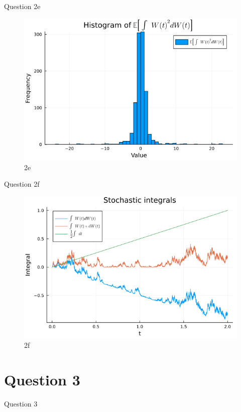 \documentclass[compress,12pt]{beamer}
\begin{document}
\begin{frame}{Question 2e}
      \begin{figure}[H]
            \centering
            \includegraphics[scale=0.5]{imgs/2e.png}
            \caption{2e}
            \label{fig:2e}
      \end{figure}

\end{frame}

\begin{frame}{Question 2f}
      \begin{figure}[H]
            \centering
            \includegraphics[scale=0.5]{imgs/2f.png}
            \caption{2f}
            \label{fig:2f}
      \end{figure}

\end{frame}

\section{Question 3}
\begin{frame}{Question 3}
\end{frame}
\end{document}
